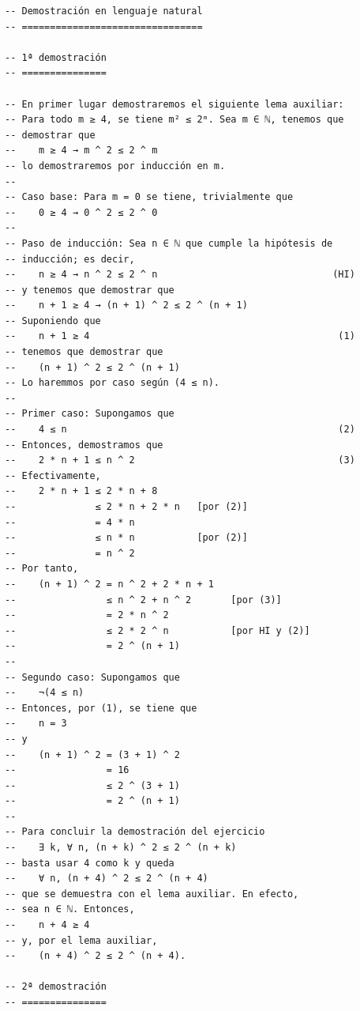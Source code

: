 \begin{verbatim}
-- Demostración en lenguaje natural
-- ================================

-- 1ª demostración
-- ===============

-- En primer lugar demostraremos el siguiente lema auxiliar:
-- Para todo m ≥ 4, se tiene m² ≤ 2ᵐ. Sea m ∈ ℕ, tenemos que
-- demostrar que
--    m ≥ 4 → m ^ 2 ≤ 2 ^ m
-- lo demostraremos por inducción en m.
--
-- Caso base: Para m = 0 se tiene, trivialmente que
--    0 ≥ 4 → 0 ^ 2 ≤ 2 ^ 0
--
-- Paso de inducción: Sea n ∈ ℕ que cumple la hipótesis de
-- inducción; es decir,
--    n ≥ 4 → n ^ 2 ≤ 2 ^ n                               (HI)
-- y tenemos que demostrar que
--    n + 1 ≥ 4 → (n + 1) ^ 2 ≤ 2 ^ (n + 1)
-- Suponiendo que
--    n + 1 ≥ 4                                            (1)
-- tenemos que demostrar que
--    (n + 1) ^ 2 ≤ 2 ^ (n + 1)
-- Lo haremmos por caso según (4 ≤ n).
--
-- Primer caso: Supongamos que
--    4 ≤ n                                                (2)
-- Entonces, demostramos que
--    2 * n + 1 ≤ n ^ 2                                    (3)
-- Efectivamente,
--    2 * n + 1 ≤ 2 * n + 8
--              ≤ 2 * n + 2 * n   [por (2)]
--              = 4 * n
--              ≤ n * n           [por (2)]
--              = n ^ 2
-- Por tanto,
--    (n + 1) ^ 2 = n ^ 2 + 2 * n + 1
--                ≤ n ^ 2 + n ^ 2       [por (3)]
--                = 2 * n ^ 2
--                ≤ 2 * 2 ^ n           [por HI y (2)]
--                = 2 ^ (n + 1)
--
-- Segundo caso: Supongamos que
--    ¬(4 ≤ n)
-- Entonces, por (1), se tiene que
--    n = 3
-- y
--    (n + 1) ^ 2 = (3 + 1) ^ 2
--                = 16
--                ≤ 2 ^ (3 + 1)
--                = 2 ^ (n + 1)
--
-- Para concluir la demostración del ejercicio
--    ∃ k, ∀ n, (n + k) ^ 2 ≤ 2 ^ (n + k)
-- basta usar 4 como k y queda
--    ∀ n, (n + 4) ^ 2 ≤ 2 ^ (n + 4)
-- que se demuestra con el lema auxiliar. En efecto,
-- sea n ∈ ℕ. Entonces,
--    n + 4 ≥ 4
-- y, por el lema auxiliar,
--    (n + 4) ^ 2 ≤ 2 ^ (n + 4).

-- 2ª demostración
-- ===============


\end{verbatim}

